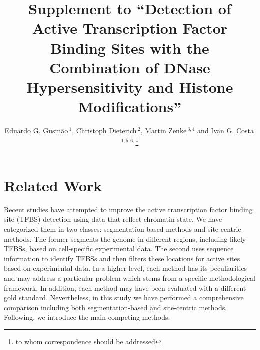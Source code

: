\documentclass{bioinfo}
\begin{document}

\title[Supplement to Detection of Active TFBSs with the Combination of DNase Hypersensitivity and Histone Modifications]
{Supplement to ``Detection of Active Transcription Factor Binding Sites with the Combination of DNase Hypersensitivity and Histone Modifications''}
\author[Gusm\~{a}o \textit{et~al}]{Eduardo G. Gusm\~{a}o\,$^{1}$, Christoph Dieterich\,$^{2}$, Martin Zenke\,$^{3,4}$ and Ivan G. Costa\,$^{1,5,6,}$\footnote{to whom correspondence should be addressed}}
\address{$^{1}$IZKF Computational Biology Research Group, Institute for Biomedical Engineering, RWTH Aachen University Medical School, Germany.\\
$^{2}$Computational RNA Biology and Ageing, Max Planck Institute for Biology of Ageing, Germany. \\
$^{3}$Department of Cell Biology, Institute for Biomedical Engineering, RWTH
Aachen University Medical School, Germany. \\
$^{4}$Helmholtz Institute for Biomedical Engineering, RWTH Aachen University, Germany. \\
$^{5}$Aachen Institute for Advanced Study in Computational Engineering Science (AICES), RWTH Aachen University, Germany. \\
$^{6}$Center of Informatics, Federal University of Pernambuco, Brazil.
}



\maketitle

\section{Related Work}
\label{sec:related.work}

Recent studies have attempted to improve the active transcription factor binding site (TFBS)
detection using data that reflect chromatin state. We have categorized them in two
classes: segmentation-based methods and site-centric methods. The former
segments the genome in different regions, including likely TFBSs,
based on cell-specific experimental data. The second uses sequence information to identify
TFBSs and then filters these locations for active sites based on
experimental data. In a higher level, each method has its peculiarities and may
address a particular problem which stems from a specific methodological
framework. In addition, each method may have been evaluated with a different
gold standard. Nevertheless, in this study we have performed a comprehensive
comparison including both segmentation-based and site-centric methods.
Following, we introduce the main competing methods.
\end{document}
